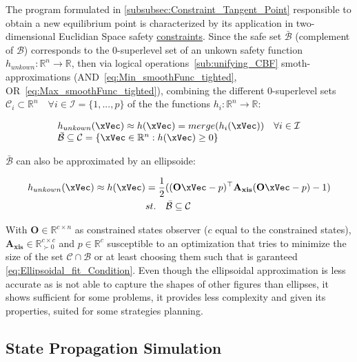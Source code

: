 The program formulated in \ref{subsubsec:Constraint_Tangent_Point} responsible to obtain a new equilibrium point is characterized by its application in two-dimensional Euclidian Space safety \underline{constraints}. Since the safe set \(\bar{\mathcal{B}}\) (complement of \(\mathcal{B}\)) corresponds to the 0-superlevel set of an unkown safety function \(h_{unkown}: \mathbb{R}^n \to \mathbb{R}\), then via logical operations~\ref{sub:unifying_CBF} smoth-approximations (AND~\ref{eq:Min_smoothFunc_tighted}, OR~\ref{eq:Max_smoothFunc_tighted}), combining the different 0-superlevel sets \(\mathcal{C}_i \subset \mathbb{R}^n \quad \forall i \in \mathcal{I} = \{1,...,p\}\) of the the functions \(h_i: \mathbb{R}^n \to \mathbb{R}\):

\begin{equation}
    \begin{array}{l}
        h_{unkown}(\xVec) \approx h(\xVec) = merge(h_i(\xVec)) \quad \forall i \in \mathcal{I} \\
        \bar{\mathcal{B}} \subseteq \mathcal{C} = \{\xVec \in \mathbb{R}^n: h(\xVec) \geq 0\}
    \end{array}
    \label{eq:Polytope_fit}
\end{equation}

\(\bar{\mathcal{B}}\) can also be approximated by an ellipsoide:

\begin{align}
        h_{unkown}(\xVec) \approx h(\xVec) &= \frac{1}{2}((\mathbf{O}\xVec - p)^{\top}\mathbf{A_{xis}}(\mathbf{O}\xVec - p) - 1) \label{eq:Ellipsoidal_fit} \\
        &st. \quad \bar{\mathcal{B}} \subseteq \mathcal{C} \label{eq:Ellipsoidal_fit_Condition}
\end{align}

With \(\mathbf{O} \in \mathbb{R}^{c \times n}\) as constrained states observer (\(c\) equal to the constrained states), \(\mathbf{A_{xis}} \in \mathbb{R}^{c \times c}_{\succ 0}\) and \(p \in \mathbb{R}^{c}\) susceptible to an optimization that tries to minimize the size of the set \(\mathcal{C} \cap \mathcal{B}\) or at least choosing them such that is garanteed \ref{eq:Ellipsoidal_fit_Condition}. Even though the ellipsoidal approximation is less accurate as is not able to capture the shapes of other figures than ellipses, it shows sufficient for some problems, it provides less complexity and given its properties, suited for some strategies planning. \\


\subsection{State Propagation Simulation}
\label{subsub:State_Propagation_Simulation_Algorithm}


